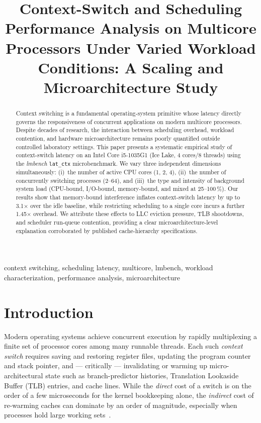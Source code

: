 \documentclass[conference]{IEEEtran}
\title{Context-Switch and Scheduling Performance Analysis on Multicore Processors
       Under Varied Workload Conditions: A Scaling and Microarchitecture Study}
\author{
  \IEEEauthorblockN{Shikhar Mutta}
  \IEEEauthorblockA{
    Department of Computer Science and Engineering\\
    Indian Institute of Technology\\
    \textit{shikhar@example.edu}}
}
\begin{document}
\maketitle

\begin{abstract}
Context switching is a fundamental operating-system primitive whose latency
directly governs the responsiveness of concurrent applications on modern
multicore processors.  Despite decades of research, the interaction between
scheduling overhead, workload contention, and hardware microarchitecture
remains poorly quantified outside controlled laboratory settings.
This paper presents a systematic empirical study of context-switch latency
on an Intel Core i5-1035G1 (Ice Lake, 4 cores/8 threads) using the
\textit{lmbench} \texttt{lat\_ctx} microbenchmark.
We vary three independent dimensions simultaneously: (i)~the number of
active CPU cores (1, 2, 4), (ii)~the number of concurrently switching
processes (2–64), and (iii)~the type and intensity of background system
load (CPU-bound, I/O-bound, memory-bound, and mixed at 25–100\,\%).
Our results show that memory-bound interference inflates context-switch
latency by up to 3.1$\times$ over the idle baseline, while restricting
scheduling to a single core incurs a further 1.45$\times$ overhead.
We attribute these effects to LLC eviction pressure, TLB shootdowns, and
scheduler run-queue contention, providing a clear microarchitecture-level
explanation corroborated by published cache-hierarchy specifications.
\end{abstract}

\begin{IEEEkeywords}
context switching, scheduling latency, multicore, lmbench, workload
characterization, performance analysis, microarchitecture
\end{IEEEkeywords}

\section{Introduction}

Modern operating systems achieve concurrent execution by rapidly multiplexing
a finite set of processor cores among many runnable threads.  Each such
\emph{context switch} requires saving and restoring register files, updating
the program counter and stack pointer, and --- critically --- invalidating or
warming up micro-architectural state such as branch-predictor histories,
Translation Lookaside Buffer (TLB) entries, and cache lines.  While the
\emph{direct} cost of a switch is on the order of a few microseconds for the
kernel bookkeeping alone, the \emph{indirect} cost of re-warming caches can
dominate by an order of magnitude, especially when processes hold large working
sets~\cite{li2007quantifying}.
\end{document}
